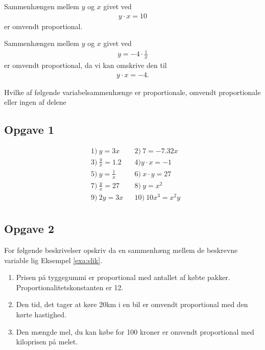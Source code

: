 \begin{exa}
	Sammenhængen mellem $y$ og $x$ givet ved
	\begin{align*}
		y\cdot x = 10
	\end{align*}
	er omvendt proportional.
\end{exa}

\begin{exa}
	Sammenhængen mellem $y$ og $x$ givet ved
	\begin{align*}
		y = -4 \cdot \frac{1}{x}
	\end{align*}
	er omvendt proportional, da vi kan omskrive den til
	\begin{align*}
		y\cdot x = -4.
	\end{align*}
\end{exa}


Hvilke af følgende variabelsammenhænge er proportionale, omvendt proportionale eller ingen af delene
\subsection*{Opgave 1}

\begin{align*}
	&1) \ y = 3x   &&2) \  7 = -7.32x \\
	&3) \ \frac{y}{x} = 1.2  &&4) y\cdot x = -1 \\
	&5) \  y = \frac{1}{x} &&6) \  x\cdot y = 27    \\
	&7) \ \frac{y}{x} = 27 &&8) \  y=x^2   \\
	&9) \ 2y = 3x &&10) \ 10x^3 = x^2y    \\
\end{align*}

\subsection*{Opgave 2}
For følgende beskrivelser opskriv da en sammenhæng mellem de beskrevne variable lig Eksempel \ref{exa:slik}.
\begin{enumerate}[label=\roman*)]
	\item Prisen på tyggegummi er proportional med antallet af købte pakker. Proportionalitetskonstanten er 12.
	\item Den tid, det tager at køre 20km i en bil er omvendt proportional med den kørte hastighed.
	\item Den mængde mel, du kan købe for 100 kroner er omvendt proportional med kiloprisen på melet. 
\end{enumerate}

